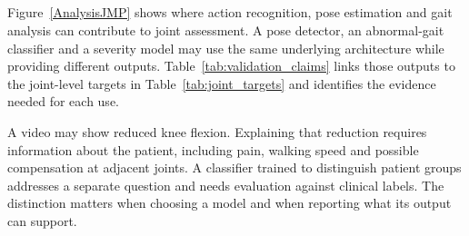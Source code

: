 \documentclass[12pt,nopreprintline]{elsarticle}
\begin{document}
\subsection{}
\label{sec:KO}
\begin{revision}
Figure~\ref{AnalysisJMP} shows where action recognition, pose estimation and gait analysis can contribute to joint assessment. A pose detector, an abnormal-gait classifier and a severity model may use the same underlying architecture while providing different outputs. Table~\ref{tab:validation_claims} links those outputs to the joint-level targets in Table~\ref{tab:joint_targets} and identifies the evidence needed for each use.

A video may show reduced knee flexion. Explaining that reduction requires information about the patient, including pain, walking speed and possible compensation at adjacent joints. A classifier trained to distinguish patient groups addresses a separate question and needs evaluation against clinical labels. The distinction matters when choosing a model and when reporting what its output can support.
\end{revision}
\end{document}
